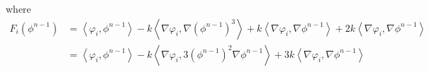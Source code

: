 \documentclass{article}
\newcommand\ang[1]{\left\langle #1 \right\rangle}
\begin{document}
where
\begin{align}
    F_i(\phi^{n-1}) &= \ang{\varphi_i, \phi^{n-1}} - k\ang{\nabla \varphi_i, \nabla (\phi^{n-1})^3} + k\ang{\nabla\varphi_i, \nabla \phi^{n-1}} + 2k\ang{\nabla\varphi_i, \nabla\phi^{n-1}}\\
    &= \ang{\varphi_i, \phi^{n-1}} - k\ang{\nabla\varphi_i, 3(\phi^{n-1})^2\nabla\phi^{n-1}} + 3k\ang{\nabla \varphi_i, \nabla \phi^{n-1}}
\end{align}
\end{document}
